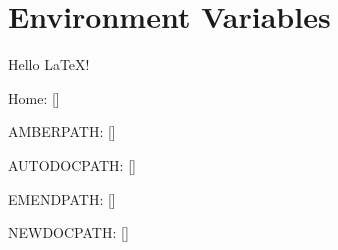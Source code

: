 \documentclass{article}%
\newcommand{\tlcVspace}{\vspace{3mm}}%
\begin{document}
%

\section{Environment Variables}
Hello \LaTeX!

\tlcVspace

Home: [\home]
\tlcVspace

AMBERPATH: [\amberPath]
\tlcVspace

AUTODOCPATH: [\autodocPath]
\tlcVspace

EMENDPATH: [\emendPath]
\tlcVspace

NEWDOCPATH: [\newdocPath]
\tlcVspace
\end{document}
